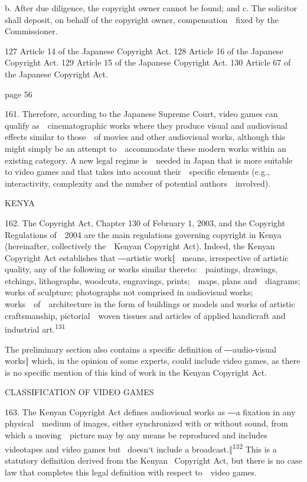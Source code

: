 \documentclass[
]{article}
\begin{document}
{b. After due diligence, the copyright owner cannot be found; and c. The
solicitor shall deposit, on behalf of the copyright owner,
compensation~~fixed by the Commissioner.}

{127 }{Article 14 of the Japanese }{Copyright Act}{. }{128 }{Article 16
of the Japanese }{Copyright Act}{. }{129 }{Article 15 of the Japanese
}{Copyright Act}{. }{130 }{Article 67 of the Japanese }{Copyright
Act}{.}

{page 56}

{161. }{Therefore, according to the Japanese Supreme Court, video games
can qualify as~~cinematographic works where they produce visual and
audiovisual effects similar to those~~of movies and other audiovisual
works, although this might simply be an attempt to~~accommodate these
modern works within an existing category. A new legal regime is~~needed
in Japan that is more suitable to video games and that takes into
account their~~specific elements (e.g., interactivity, complexity and
the number of potential authors~~involved).}

{KENYA}

{162. }{The }{Copyright Act}{, Chapter 130 of February 1, 2003, and the
}{Copyright Regulations of~~2004 }{are the main regulations governing
copyright in Kenya (hereinafter, collectively the~~Kenyan }{Copyright
Act}{). Indeed, the Kenyan }{Copyright Act }{establishes that ―artistic
work‖ }{~means, irrespective of artistic quality, any of the following
or works similar thereto:~~paintings, drawings, etchings, lithographs,
woodcuts, engravings, prints;~~maps, plans and~~diagrams; works of
sculpture; photographs not comprised in audiovisual works;
works~~of~~architecture in the form of buildings or models and works of
artistic craftsmanship, pictorial~~woven tissues and articles of applied
handicraft and industrial art.}\textsuperscript{{131}}

{The preliminary section also contains a specif}{ic definition of
―}{audio-visual works}{‖ which, in }{the opinion of some experts, could
include video games, as there is no specific mention of this kind of
work in the Kenyan }{Copyright Act}{.}

{CLASSIFICATION OF VIDEO GAMES}

{163. }{The Kenyan }{Copyright Act }{defines aud}{iovisual works as ―}{a
fixation in any physical~~medium of images, either synchronized with or
without sound, from which a moving~~picture may by any means be
reproduced and includes videotapes and video games but }{~doesn`t
include a broadcast.}{‖}\textsuperscript{{132 }}{This is a statutory
definition derived from the Kenyan }{~Copyright Act}{, but there is no
case law that completes this legal definition with respect to~~video
games.}
\end{document}
